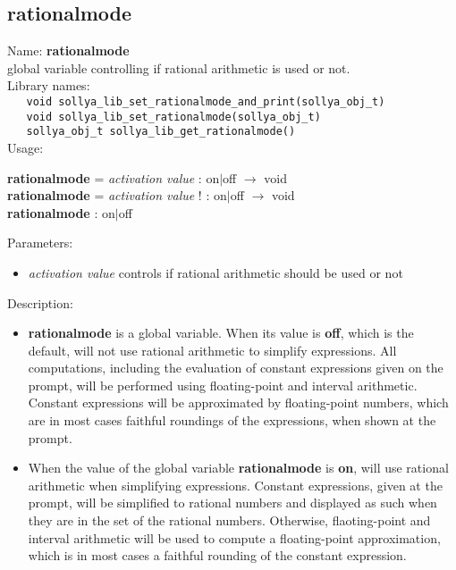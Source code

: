\subsection{rationalmode}
\label{labrationalmode}
\noindent Name: \textbf{rationalmode}\\
\phantom{aaa}global variable controlling if rational arithmetic is used or not.\\[0.2cm]
\noindent Library names:\\
\verb|   void sollya_lib_set_rationalmode_and_print(sollya_obj_t)|\\
\verb|   void sollya_lib_set_rationalmode(sollya_obj_t)|\\
\verb|   sollya_obj_t sollya_lib_get_rationalmode()|\\[0.2cm]
\noindent Usage: 
\begin{center}
\textbf{rationalmode} = \emph{activation value} : \textsf{on$|$off} $\rightarrow$ \textsf{void}\\
\textbf{rationalmode} = \emph{activation value} ! : \textsf{on$|$off} $\rightarrow$ \textsf{void}\\
\textbf{rationalmode} : \textsf{on$|$off}\\
\end{center}
Parameters: 
\begin{itemize}
\item \emph{activation value} controls if rational arithmetic should be used or not
\end{itemize}
\noindent Description: \begin{itemize}

\item \textbf{rationalmode} is a global variable. When its value is \textbf{off}, which is the default,
   \sollya will not use rational arithmetic to simplify expressions. All computations,
   including the evaluation of constant expressions given on the \sollya prompt,
   will be performed using floating-point and interval arithmetic. Constant expressions
   will be approximated by floating-point numbers, which are in most cases faithful 
   roundings of the expressions, when shown at the prompt. 

\item When the value of the global variable \textbf{rationalmode} is \textbf{on}, \sollya will use 
   rational arithmetic when simplifying expressions. Constant expressions, given 
   at the \sollya prompt, will be simplified to rational numbers and displayed 
   as such when they are in the set of the rational numbers. Otherwise, flaoting-point
   and interval arithmetic will be used to compute a floating-point approximation,
   which is in most cases a faithful rounding of the constant expression.
\end{itemize}
